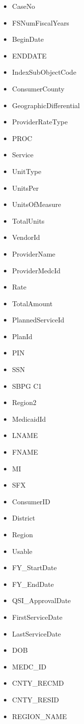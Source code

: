 \documentclass[12pt, letterpaper]{article}
\begin{document}
\begin{itemize}
\noindent \textbf{Other Items Not included}\\
	\item CaseNo
	\item FSNumFiscalYears
	\item BeginDate
	\item ENDDATE
	\item IndexSubObjectCode
	\item ConsumerCounty
	\item GeographicDifferential
	\item ProviderRateType
	\item PROC
	\item Service
	\item UnitType
	\item UnitsPer
	\item UnitsOfMeasure
	\item TotalUnits
	\item VendorId
	\item ProviderName
	\item ProviderMedcId
	\item Rate
	\item TotalAmount
	\item PlannedServiceId
	\item PlanId
	\item PIN
	\item SSN
	\item SBPG C1
	\item Region2
	\item MedicaidId
	\item LNAME
	\item FNAME
	\item MI
	\item SFX
	\item ConsumerID
	\item District
	\item Region
	\item Usable
	\item FY_StartDate
	\item FY_EndDate
	\item QSI_ApprovalDate
	\item FirstServiceDate
	\item LastServiceDate
	\item DOB
	\item MEDC_ID
	\item CNTY_RECMD
	\item CNTY_RESID
	\item REGION_NAME

\end{itemize}
\end{document}
